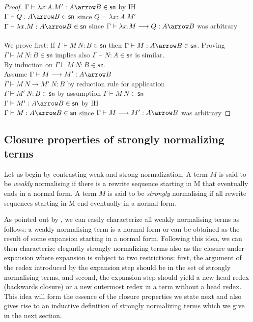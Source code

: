 \documentclass{article}
\newcommand{\csn}{\mathsf{sn}}
\newcommand{\red}{\longrightarrow}
\begin{document}
\begin{proof}
$\Gamma \vdash \lambda x{:}A.M' : A \arrow B\in \csn$ \hfill by IH \\
$\Gamma \vdash Q : A \arrow B \in \csn$ \hfill since $Q = \lambda x{:}A.M'$\\
$\Gamma \vdash \lambda x.M : A \arrow B \in \csn$ \hfill since $\Gamma \vdash \lambda x.M \red Q : A \arrow B$ was arbitrary
\\[1em]
\fbox{\ref{pp6}. If $\Gamma \vdash M~N : B \in \csn$
                 then $\Gamma \vdash M : A \arrow B \in \csn$ and $\Gamma \vdash N : A \in \csn$.}
\\[1em]
We prove first: If $\Gamma \vdash M~N : B\in \csn$ then $\Gamma \vdash M : A \arrow B\in \csn$.
Proving $\Gamma \vdash M~N : B \in \csn$ implies also $\Gamma \vdash N : A\in \csn$ is similar.
\\
By induction on $\Gamma \vdash M~N : B \in \csn$.
\\[1em]
Assume $\Gamma \vdash M \red M': A \arrow B $\\
$\Gamma \vdash M~N \red M'~N : B $ \hfill by reduction rule for application \\
$\Gamma \vdash M'~N : B \in \csn$ \hfill by assumption $\Gamma \vdash M~N \in \csn$\\
$\Gamma \vdash M' : A \arrow B \in \csn$ \hfill by IH\\
$\Gamma \vdash M  : A \arrow B \in \csn$ \hfill since $\Gamma \vdash M \red M' : A \arrow B$ was arbitrary

\end{proof}

\subsection*{Closure properties of strongly normalizing terms}

Let us begin by contrasting weak and strong normalization. A term $M$ is said to be \emph{weakly} normalising if there is a  rewrite sequence starting in M that eventually ends in a  normal form. A  term $M$ is said to be \emph{strongly} normalising if all rewrite sequences starting in M end eventually in a  normal form.

As pointed out by \cite{Raamsdonk_onnormalisation}, we can easily characterize all weakly normalising terms as follows: a  weakly normalising term is a normal form or can be obtained as the result of some expansion starting in a  normal form. Following this idea, we can then characterize elegantly strongly normalizing terms also as the closure under expansion where expansion is subject to two restrictions: first, the argument of the redex introduced by the expansion step should be in the set of strongly normalising terms, and second, the expansion step should yield a new head redex (backwards closure) or a  new outermost redex in a  term without a  head redex. This idea will form the essence of the closure properties we state next and also gives rise to an inductive definition of strongly normalizing terms which we give in the next section.
\end{document}
